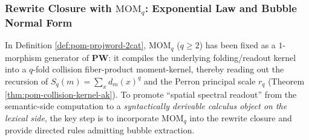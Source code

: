 \subsubsection{Rewrite Closure with \texorpdfstring{$\mathrm{MOM}_q$}{MOMq}: Exponential Law and Bubble Normal Form}\label{subsec:pom-mom-rewrite-normal}

In Definition \ref{def:pom-projword-2cat}, \(\mathrm{MOM}_q\) (\(q\ge 2\)) has been fixed as a \(1\)-morphism generator of \(\mathbf{PW}\): it compiles the underlying folding/readout kernel into a \(q\)-fold collision fiber-product moment-kernel, thereby reading out the recursion of \(S_q(m)=\sum_x d_m(x)^q\) and the Perron principal scale \(r_q\) (Theorem \ref{thm:pom-collision-kernel-ak}).
To promote ``spatial spectral readout'' from the semantic-side computation to a \emph{syntactically derivable calculus object on the lexical side}, the key step is to incorporate \(\mathrm{MOM}_q\) into the rewrite closure and provide directed rules admitting bubble extraction.

